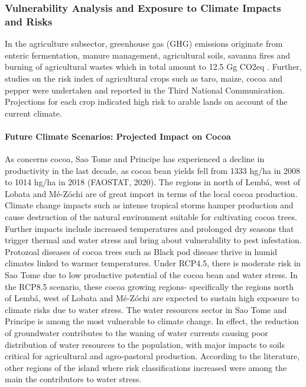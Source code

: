 \documentclass[
]{book}
\begin{document}
\hypertarget{vulnerability-analysis-and-exposure-to-climate-impacts-and-risks-1}{%
\subsubsection{Vulnerability Analysis and Exposure to Climate Impacts and Risks}\label{vulnerability-analysis-and-exposure-to-climate-impacts-and-risks-1}}

In the agriculture subsector, greenhouse gas (GHG) emissions originate from enteric fermentation, manure management, agricultural soils, savanna fires and burning of agricultural wastes which in total amount to 12.5 Gg CO2eq . Further, studies on the risk index of agricultural crops such as taro, maize, cocoa and pepper were undertaken and reported in the Third National Communication. Projections for each crop indicated high risk to arable lands on account of the current climate.

\hypertarget{future-climate-scenarios-projected-impact-on-cocoa-1}{%
\paragraph{Future Climate Scenarios: Projected Impact on Cocoa}\label{future-climate-scenarios-projected-impact-on-cocoa-1}}

As concerns cocoa, Sao Tome and Principe has experienced a decline in productivity in the last decade, as cocoa bean yields fell from 1333 hg/ha in 2008 to 1014 hg/ha in 2018 (FAOSTAT, 2020). The regions in north of Lembá, west of Lobata and Mé-Zóchi are of great import in terms of the local cocoa production. Climate change impacts such as intense tropical storms hamper production and cause destruction of the natural environment suitable for cultivating cocoa trees. Further impacts include increased temperatures and prolonged dry seasons that trigger thermal and water stress and bring about vulnerability to pest infestation. Protozoal diseases of cocoa trees such as Black pod disease thrive in humid climates linked to warmer temperatures. Under RCP4.5, there is moderate risk in Sao Tome due to low productive potential of the cocoa bean and water stress. In the RCP8.5 scenario, these cocoa growing regions- specifically the regions north of Lembá, west of Lobata and Mé-Zóchi are expected to sustain high exposure to climate risks due to water stress. The water resources sector in Sao Tome and Principe is among the most vulnerable to climate change. In effect, the reduction of groundwater contributes to the waning of water currents causing poor distribution of water resources to the population, with major impacts to soils critical for agricultural and agro-pastoral production. According to the literature, other regions of the island where risk classifications increased were among the main the contributors to water stress.
\end{document}
